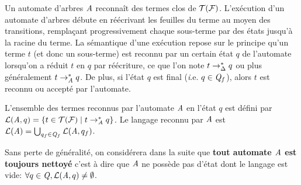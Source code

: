 Un automate d'arbres $\mathit A$ reconnaît des termes clos de $\mathcal{T(F)}$. L'exécution d'un automate d'arbres
débute en réécrivant les feuilles du terme au moyen des transitions, remplaçant progressivement
chaque sous-terme par des états jusqu'à la racine du terme. La sémantique d'une exécution 
repose sur le principe qu'un terme $t$ (et donc un sous-terme) est reconnu par un certain état $q$ de l'automate lorsqu'on a
réduit $t$ en $q$ par réécriture, ce que l'on note $t \rightarrow_\Delta^* q$ ou plus généralement $t \rightarrow_\mathit A^* q$. De plus, si l'état $q$
est final (\textit i.e. $q \in \mathit Q_f$), alors $t$ est reconnu ou accepté par l'automate.

\begin{definition}
  L'ensemble des termes reconnus par l'automate $\mathit A$ en l'état $q$ est défini par $\mathcal{L}(\mathit A, q) = \{ t \in \mathcal{T(F)} \; | \; t \rightarrow_\mathit A^* q\}$.
  Le langage reconnu par $\mathit A$ est $\mathcal{L}(\mathit A) = \bigcup_{q_f\in \mathit Q_f} \mathcal{L}(\mathit A, q_f)$. 
\end{definition}
Sans perte de généralité, on considérera dans la suite que \textbf{tout automate $\mathit A$ est toujours nettoyé}
c'est à dire que $\mathit A$ ne possède pas d'état dont le langage est vide: $\forall q \in \mathit Q, \mathcal{L}(\mathit A, q) \not= \emptyset$.

